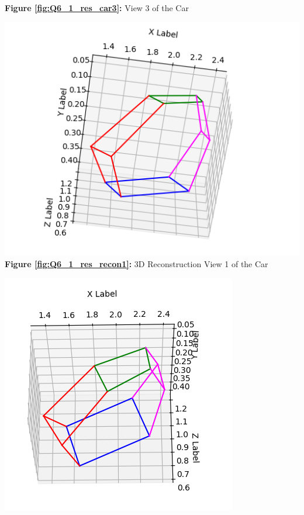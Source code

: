 \begin{your_solution}[title=Q6.1,height=21.5cm,width=\linewidth]
\begin{minipage}[b]{0.32\textwidth}
	\textbf{Figure \ref{fig:Q6_1_res_car3}:} View 3 of the Car
	\label{fig:Q6_1_res_car3}  
\end{minipage}
\newline %

\begin{minipage}[b]{0.34\textwidth}
	\centering
	\includegraphics[width=\textwidth]{../Q6_1_res_recon1.png}
	\textbf{Figure \ref{fig:Q6_1_res_recon1}:} 3D Reconstruction View 1 of the Car
	\label{fig:Q6_1_res_recon1}  
\end{minipage}
\begin{minipage}[b]{0.28\textwidth}
	\centering
	\includegraphics[width=\textwidth]{../Q6_1_res_recon2.png}

\end{minipage}
\end{your_solution}
